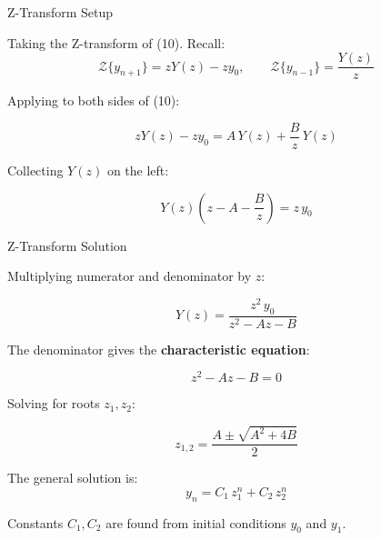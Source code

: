 \documentclass{beamer}
\begin{document}
\begin{frame}{Z-Transform Setup}

Taking the Z-transform of (10). Recall:
\[
    \mathcal{Z}\{y_{n+1}\} = zY(z) - zy_0, \qquad
    \mathcal{Z}\{y_{n-1}\} = \frac{Y(z)}{z}
\]

Applying to both sides of (10):

\begin{equation}
    zY(z) - zy_0 = A\,Y(z) + \frac{B}{z}\,Y(z)
\end{equation}

Collecting $Y(z)$ on the left:

\begin{equation}
    Y(z)\!\left(z - A - \frac{B}{z}\right) = z\,y_0
\end{equation}

\end{frame}

\begin{frame}{Z-Transform Solution}

Multiplying numerator and denominator by $z$:

\begin{equation}
    \boxed{Y(z) = \frac{z^2\,y_0}{z^2 - Az - B}}
\end{equation}

The denominator gives the \textbf{characteristic equation}:

\begin{equation}
    z^2 - Az - B = 0
\end{equation}

Solving for roots $z_1, z_2$:

\begin{equation}
    z_{1,2} = \frac{A \pm \sqrt{A^2 + 4B}}{2}
\end{equation}

The general solution is:
\begin{equation}
    y_n = C_1\,z_1^n + C_2\,z_2^n
\end{equation}

Constants $C_1, C_2$ are found from initial conditions $y_0$ and $y_1$.

\end{frame}
\end{document}
